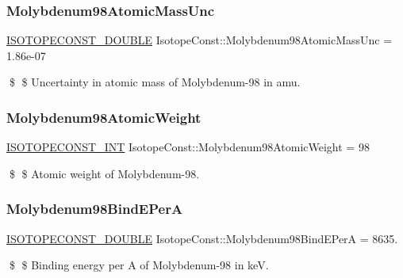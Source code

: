 \subsubsection{\texorpdfstring{Molybdenum98\+Atomic\+Mass\+Unc}{Molybdenum98AtomicMassUnc}}
{\footnotesize\ttfamily \mbox{\hyperlink{group___isotope_const-_macros_ga8f45a7272ce02c0b4c65c44636ed719a}{I\+S\+O\+T\+O\+P\+E\+C\+O\+N\+S\+T\+\_\+\+D\+O\+U\+B\+LE}} Isotope\+Const\+::\+Molybdenum98\+Atomic\+Mass\+Unc = 1.\+86e-\/07}

\$ \$ Uncertainty in atomic mass of Molybdenum-\/98 in amu. \mbox{\label{group___isotope_const-_molybdenum-_mo98_ga266a6867c988a29695311dd4ae1589e0}} 
\subsubsection{\texorpdfstring{Molybdenum98\+Atomic\+Weight}{Molybdenum98AtomicWeight}}
{\footnotesize\ttfamily \mbox{\hyperlink{group___isotope_const-_macros_ga5f18360b3e99483a35c32d789e62621c}{I\+S\+O\+T\+O\+P\+E\+C\+O\+N\+S\+T\+\_\+\+I\+NT}} Isotope\+Const\+::\+Molybdenum98\+Atomic\+Weight = 98}

\$ \$ Atomic weight of Molybdenum-\/98. \mbox{\label{group___isotope_const-_molybdenum-_mo98_ga00c1cb41c84e65925a71db52801b49d9}} 
\subsubsection{\texorpdfstring{Molybdenum98\+Bind\+E\+PerA}{Molybdenum98BindEPerA}}
{\footnotesize\ttfamily \mbox{\hyperlink{group___isotope_const-_macros_ga8f45a7272ce02c0b4c65c44636ed719a}{I\+S\+O\+T\+O\+P\+E\+C\+O\+N\+S\+T\+\_\+\+D\+O\+U\+B\+LE}} Isotope\+Const\+::\+Molybdenum98\+Bind\+E\+PerA = 8635.}

\$ \$ Binding energy per A of Molybdenum-\/98 in keV. \mbox{\label{group___isotope_const-_molybdenum-_mo98_ga4d95e248eaccef55e3a79fc7e67194d3}} 
